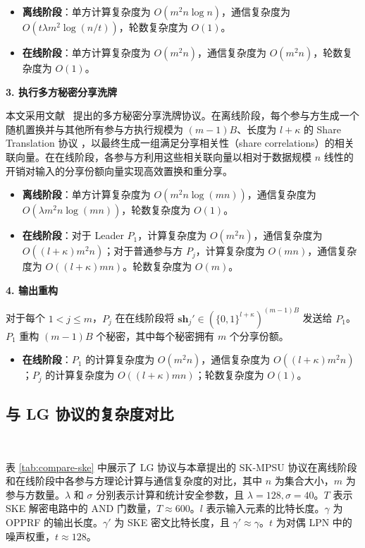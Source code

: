 \begin{trivlist}
\begin{itemize}
    \item \textbf{离线阶段}：单方计算复杂度为 $O(m^2 n \log n)$，通信复杂度为 $O(t \lambda m^2 \log (n / t))$，轮数复杂度为 $O(1)$。
    \item \textbf{在线阶段}：单方计算复杂度为 $O(m^2 n)$，通信复杂度为 $O(m^2 n)$，轮数复杂度为 $O(1)$。
\end{itemize}

\item \textbf{3. 执行多方秘密分享洗牌}

本文采用文献~\cite{EB22} 提出的多方秘密分享洗牌协议。在离线阶段，每个参与方生成一个随机置换并与其他所有参与方执行规模为 $(m-1)B$、长度为 $l+\kappa$ 的 Share Translation 协议 \cite{CGP-ASIACRYPT-2020}，以最终生成一组满足分享相关性（share correlations）的相关联向量。在在线阶段，各参与方利用这些相关联向量以相对于数据规模 $n$ 线性的开销对输入的分享份额向量实现高效置换和重分享。

\begin{itemize}
\item \textbf{离线阶段}：单方计算复杂度为 $O(m^2 n \log (mn))$，通信复杂度为 $O(\lambda m^2 n \log (mn))$，轮数复杂度为 $O(1)$。
\item \textbf{在线阶段}：对于 Leader $P_1$，计算复杂度为 $O(m^2 n)$，通信复杂度为 $O((l+\kappa)m^2 n)$；对于普通参与方 $P_j$，计算复杂度为 $O(m n)$，通信复杂度为 $O((l+\kappa)m n)$。轮数复杂度为 $O(m)$。
\end{itemize}

\item \textbf{4. 输出重构}

对于每个 $1 < j \le m$，$P_j$ 在在线阶段将 $\textbf{sh}_{j}' \in (\{0,1\}^{l+\kappa})^{(m-1)B}$ 发送给 $P_1$。$P_1$ 重构 $(m-1)B$ 个秘密，其中每个秘密拥有 $m$ 个分享份额。

\begin{itemize}
\item \textbf{在线阶段}：$P_1$ 的计算复杂度为 $O(m^2 n)$，通信复杂度为 $O((l+\kappa) m^2 n)$；$P_j$ 的计算复杂度为 $O((l+\kappa) m n)$；轮数复杂度为 $O(1)$。
\end{itemize}
\end{trivlist}

\subsection{与 LG 协议的复杂度对比}~\label{sec:compare-lg}

表 \ref{tab:compare-ske} 中展示了 LG 协议与本章提出的 SK-MPSU 协议在离线阶段和在线阶段中各参与方理论计算与通信复杂度的对比，其中 $n$ 为集合大小，$m$ 为参与方数量。$\lambda$ 和 $\sigma$ 分别表示计算和统计安全参数，且 $\lambda = 128, \sigma = 40$。$T$ 表示 SKE 解密电路中的 AND 门数量，$T \approx 600$。$l$ 表示输入元素的比特长度。$\gamma$ 为 OPPRF 的输出长度。$\gamma'$ 为 SKE 密文比特长度，且 $\gamma' \approx \gamma$。$t$ 为对偶 LPN 中的噪声权重，$t \approx 128$。

